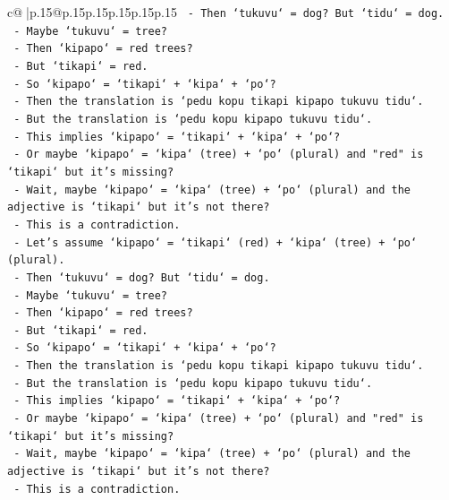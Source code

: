 \documentclass{article}
\begin{document}
{\begin{supertabular}{c@{$\;$}|p{.15\linewidth}@{}p{.15\linewidth}p{.15\linewidth}p{.15\linewidth}p{.15\linewidth}p{.15\linewidth}}
{{{\texttt{          {-} Then `tukuvu` = dog? But `tidu` = dog.} \\
\texttt{          {-} Maybe `tukuvu` = tree?} \\
\texttt{          {-} Then `kipapo` = red trees?} \\
\texttt{          {-} But `tikapi` = red.} \\
\texttt{          {-} So `kipapo` = `tikapi` + `kipa` + `po`?} \\
\texttt{          {-} Then the translation is `pedu kopu tikapi kipapo tukuvu tidu`.} \\
\texttt{          {-} But the translation is `pedu kopu kipapo tukuvu tidu`.} \\
\texttt{          {-} This implies `kipapo` = `tikapi` + `kipa` + `po`?} \\
\texttt{          {-} Or maybe `kipapo` = `kipa` (tree) + `po` (plural) and "red" is `tikapi` but it's missing?} \\
\texttt{          {-} Wait, maybe `kipapo` = `kipa` (tree) + `po` (plural) and the adjective is `tikapi` but it's not there?} \\
\texttt{          {-} This is a contradiction.} \\
\texttt{          {-} Let's assume `kipapo` = `tikapi` (red) + `kipa` (tree) + `po` (plural).} \\
\texttt{          {-} Then `tukuvu` = dog? But `tidu` = dog.} \\
\texttt{          {-} Maybe `tukuvu` = tree?} \\
\texttt{          {-} Then `kipapo` = red trees?} \\
\texttt{          {-} But `tikapi` = red.} \\
\texttt{          {-} So `kipapo` = `tikapi` + `kipa` + `po`?} \\
\texttt{          {-} Then the translation is `pedu kopu tikapi kipapo tukuvu tidu`.} \\
\texttt{          {-} But the translation is `pedu kopu kipapo tukuvu tidu`.} \\
\texttt{          {-} This implies `kipapo` = `tikapi` + `kipa` + `po`?} \\
\texttt{          {-} Or maybe `kipapo` = `kipa` (tree) + `po` (plural) and "red" is `tikapi` but it's missing?} \\
\texttt{          {-} Wait, maybe `kipapo` = `kipa` (tree) + `po` (plural) and the adjective is `tikapi` but it's not there?} \\
\texttt{          {-} This is a contradiction.} \\
}}}
\end{supertabular}}
\end{document}

